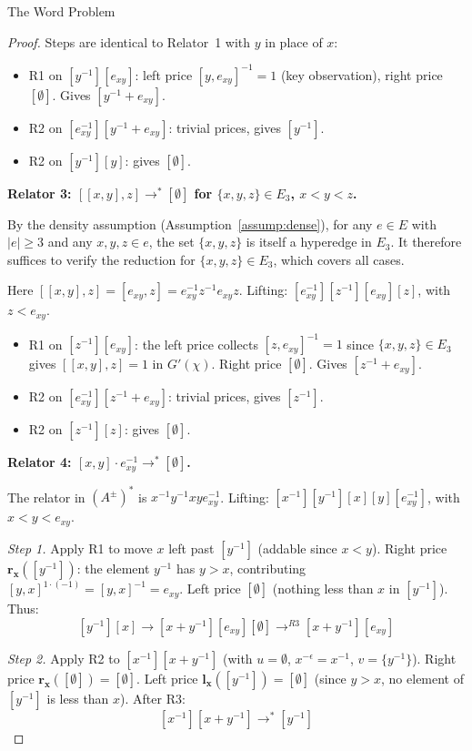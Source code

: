 \documentclass{article}
\theoremstyle{definition}
\theoremstyle{remark}
\theoremstyle{theorem}
\theoremstyle{definition}
\begin{document}
\begin{section}{The Word Problem}
\begin{proof}
Steps are identical to Relator~1 with $y$ in place of $x$:
\begin{itemize}
    \item R1 on $[y^{-1}][e_{xy}]$: left price $[y,e_{xy}]^{-1}=1$ (key observation), right price $[\emptyset]$. Gives $[y^{-1}+e_{xy}]$.
    \item R2 on $[e_{xy}^{-1}][y^{-1}+e_{xy}]$: trivial prices, gives $[y^{-1}]$.
    \item R2 on $[y^{-1}][y]$: gives $[\emptyset]$.
\end{itemize}

\medskip
\noindent\textbf{Relator 3: $[[x,y],z] \to^* [\emptyset]$ for $\{x,y,z\}\in E_3$, $x<y<z$.}

By the density assumption (Assumption~\ref{assump:dense}), for any
$e \in E$ with $|e| \geq 3$ and any $x,y,z \in e$, the set $\{x,y,z\}$
is itself a hyperedge in $E_3$. It therefore suffices to verify the
reduction for $\{x,y,z\} \in E_3$, which covers all cases.

Here $[[x,y],z]=[e_{xy},z]=e_{xy}^{-1}z^{-1}e_{xy}z$.
Lifting: $[e_{xy}^{-1}][z^{-1}][e_{xy}][z]$, with $z < e_{xy}$.

\begin{itemize}
    \item R1 on $[z^{-1}][e_{xy}]$: the left price collects $[z,e_{xy}]^{-1}=1$ since $\{x,y,z\}\in E_3$ gives $[[x,y],z]=1$ in $G'(\chi)$. Right price $[\emptyset]$. Gives $[z^{-1}+e_{xy}]$.
    \item R2 on $[e_{xy}^{-1}][z^{-1}+e_{xy}]$: trivial prices, gives $[z^{-1}]$.
    \item R2 on $[z^{-1}][z]$: gives $[\emptyset]$.
\end{itemize}

\medskip
\noindent\textbf{Relator 4: $[x,y]\cdot e_{xy}^{-1} \to^* [\emptyset]$.}

The relator in $(A^\pm)^*$ is $x^{-1}y^{-1}xye_{xy}^{-1}$.
Lifting: $[x^{-1}][y^{-1}][x][y][e_{xy}^{-1}]$, with $x < y < e_{xy}$.

\textit{Step 1.} Apply R1 to move $x$ left past $[y^{-1}]$ (addable since $x < y$). Right price $\mathbf{r_x}([y^{-1}])$: the element $y^{-1}$ has $y > x$, contributing $[y,x]^{1\cdot(-1)}=[y,x]^{-1}=e_{xy}$. Left price $[\emptyset]$ (nothing less than $x$ in $[y^{-1}]$). Thus:
$$[y^{-1}][x] \to [x+y^{-1}][e_{xy}][\emptyset] \to^{R3} [x+y^{-1}][e_{xy}]$$

\textit{Step 2.} Apply R2 to $[x^{-1}][x+y^{-1}]$ (with $u=\emptyset$, $x^{-\epsilon}=x^{-1}$, $v=\{y^{-1}\}$). Right price $\mathbf{r_x}([\emptyset])=[\emptyset]$. Left price $\mathbf{l_x}([y^{-1}])=[\emptyset]$ (since $y > x$, no element of $[y^{-1}]$ is less than $x$). After R3:
$$[x^{-1}][x+y^{-1}] \to^* [y^{-1}]$$


\end{proof}
\end{section}
\end{document}
